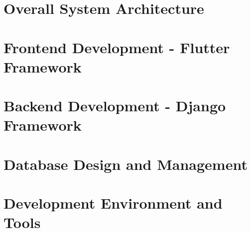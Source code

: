 \lipsum
 \section{Overall System Architecture}
 \section{Frontend Development - Flutter Framework}
 \section{Backend Development - Django Framework}
 \section{Database Design and Management}
\section{Development Environment and Tools}